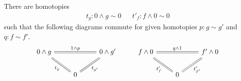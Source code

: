 \documentclass{article}
\newcommand{\smsh}{\wedge}
\begin{document}
\begin{lem}\label{lem:smash-zero}
	There are homotopies 
	\begin{align*}
	t_g : 0\smsh g\sim 0 && t'_f : f\smsh0\sim0
	\end{align*}
	such that the following diagrams
    commute for given homotopies $p : g\sim g'$ and $q : f\sim f'$.
    \begin{equation}\label{eq:t-triangles}
	\begin{tikzcd}
	0\smsh g
		\arrow[rr, equals,"1\smsh p"]
		\arrow[dr,equals,swap,"t_g"]
	&& 0\smsh g'\arrow[dl,equals,"t_{g'}"]
	&f\smsh 0
		\arrow[rr, equals,"q\smsh 1"]
		\arrow[dr,equals,swap, "t'_f"]
	&& f'\smsh 0\arrow[dl,equals,"t'_{f'}"]
	\\
	& 0
	&&& 0
	\end{tikzcd}
	\end{equation}
\end{lem}
\end{document}
